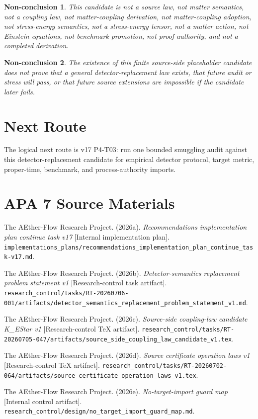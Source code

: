 \documentclass[11pt]{article}
\newtheorem{nonconclusion}{Non-conclusion}
\begin{document}
\begin{nonconclusion}
This candidate is not a source law, not matter semantics, not a coupling law,
not matter-coupling derivation, not matter-coupling adoption, not
stress-energy semantics, not a stress-energy tensor, not a matter action, not
Einstein equations, not benchmark promotion, not proof authority, and not a
completed derivation.
\end{nonconclusion}

\begin{nonconclusion}
The existence of this finite source-side placeholder candidate does not prove
that a general detector-replacement law exists, that future audit or stress
will pass, or that future source extensions are impossible if the candidate
later fails.
\end{nonconclusion}

\section{Next Route}

The logical next route is v17 P4-T03: run one bounded smuggling audit against
this detector-replacement candidate for empirical detector protocol, target
metric, proper-time, benchmark, and process-authority imports.

\section{APA 7 Source Materials}

The AEther-Flow Research Project. (2026a). \emph{Recommendations
implementation plan continue task v17} [Internal implementation plan].
\texttt{implementations\_plans/recommendations\_implementation\_plan\_continue\_task-v17.md}.

The AEther-Flow Research Project. (2026b). \emph{Detector-semantics
replacement problem statement v1} [Research-control task artifact].
\texttt{research\_control/tasks/RT-20260706-001/artifacts/detector\_semantics\_replacement\_problem\_statement\_v1.md}.

The AEther-Flow Research Project. (2026c). \emph{Source-side coupling-law
candidate K\_EStar v1} [Research-control TeX artifact].
\texttt{research\_control/tasks/RT-20260705-047/artifacts/source\_side\_coupling\_law\_candidate\_v1.tex}.

The AEther-Flow Research Project. (2026d). \emph{Source certificate operation
laws v1} [Research-control TeX artifact].
\texttt{research\_control/tasks/RT-20260702-064/artifacts/source\_certificate\_operation\_laws\_v1.tex}.

The AEther-Flow Research Project. (2026e). \emph{No-target-import guard map}
[Internal control artifact].
\texttt{research\_control/design/no\_target\_import\_guard\_map.md}.
\end{document}
